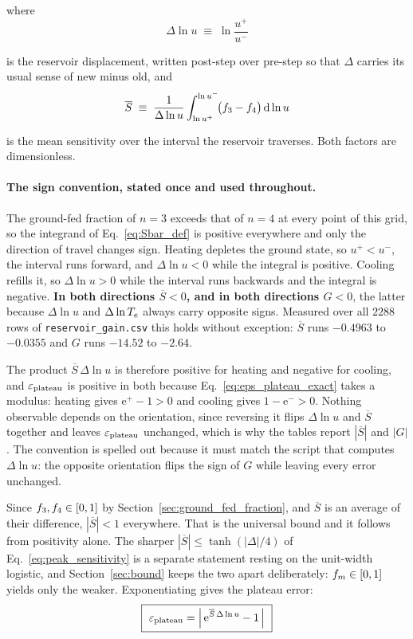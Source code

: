 \noindent where
\begin{equation}
  \Delta\ln u \;\equiv\; \ln\frac{u^+}{u^-}
  \label{eq:dlnu_def}
\end{equation}

\noindent is the reservoir displacement, written post-step over pre-step so that
$\Delta$ carries its usual sense of new minus old, and
\begin{equation}
  \overline{S} \;\equiv\;
  \frac{1}{\Delta\ln u}\int_{\ln u^+}^{\ln u^-}\!\!
  \big(f_{3}-f_{4}\big)\,\mathrm{d}\ln u
  \label{eq:Sbar_def}
\end{equation}

\noindent is the mean sensitivity over the interval the reservoir traverses.
Both factors are dimensionless.

\paragraph{The sign convention, stated once and used throughout.} The
ground-fed fraction of $n=3$ exceeds that of $n=4$ at every point of this grid,
so the integrand of Eq.~\eqref{eq:Sbar_def} is positive everywhere and only the
direction of travel changes sign. Heating depletes the ground state, so
$u^+ < u^-$, the interval runs forward, and $\Delta\ln u < 0$ while the integral
is positive. Cooling refills it, so $\Delta\ln u > 0$ while the interval runs
backwards and the integral is negative. \textbf{In both directions
$\overline{S} < 0$, and in both directions $G < 0$}, the latter because
$\Delta\ln u$ and $\Delta\ln T_e$ always carry opposite signs. Measured over all
$2288$ rows of \texttt{reservoir\_gain.csv} this holds without exception:
$\overline{S}$ runs $-0.4963$ to $-0.0355$ and $G$ runs $-14.52$ to $-2.64$.

The product $\overline{S}\,\Delta\ln u$ is therefore positive for heating and
negative for cooling, and $\varepsilon_{\mathrm{plateau}}$ is positive in both because
Eq.~\eqref{eq:eps_plateau_exact} takes a modulus: heating gives
$\mathrm{e}^{+}-1 > 0$ and cooling gives $1-\mathrm{e}^{-} > 0$. Nothing
observable depends on the orientation, since reversing it flips $\Delta\ln u$
and $\overline{S}$ together and leaves $\varepsilon_{\mathrm{plateau}}$ unchanged, which is why the
tables report $|\overline{S}|$ and $|G|$. The convention is spelled out because
it must match the script that computes $\Delta\ln u$: the opposite orientation
flips the sign of $G$ while leaving every error unchanged.

Since $f_{3},f_{4}\in[0,1]$ by Section~\ref{sec:ground_fed_fraction},
and $\overline{S}$ is an average of their difference, $|\overline{S}| < 1$
everywhere. That is the universal bound and it follows from positivity alone.
The sharper $|\overline{S}| \le \tanh(|\Delta|/4)$ of
Eq.~\eqref{eq:peak_sensitivity} is a separate statement resting on the
unit-width logistic, and Section~\ref{sec:bound} keeps the two apart
deliberately: $f_{m}\in[0,1]$ yields only the weaker.
Exponentiating gives the plateau error:
\begin{equation}
  \boxed{\ \varepsilon_{\mathrm{plateau}} = \left|\,\mathrm{e}^{\overline{S}\,\Delta\ln u} - 1\,\right|\ }
  \label{eq:eps_plateau_exact}
\end{equation}

